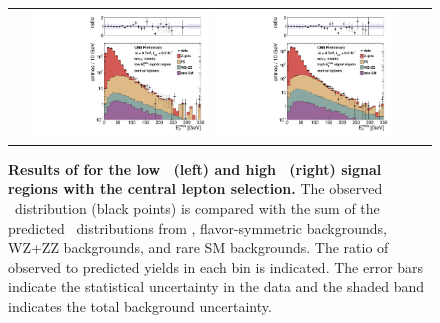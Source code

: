 \begin{figure}[!h]
\begin{center}
\begin{tabular}{cc}
\includegraphics[width=0.45\textwidth]{plots/edge_pfmet_pt40_lowMet_central_all.pdf}
\includegraphics[width=0.45\textwidth]{plots/edge_pfmet_pt40_highMet_central_all.pdf}
\end{tabular}
\caption{\footnotesize {\bf Results of for the low \MET\ (left) and high \MET\ (right) signal regions with the central lepton selection.}
The observed \MET\ distribution (black points) is compared with the sum of the predicted \MET\
distributions from \zjets, flavor-symmetric backgrounds, WZ+ZZ backgrounds, and rare SM backgrounds. 
The ratio of observed to predicted yields in each bin is
indicated. The error bars indicate the statistical uncertainty in the data and the shaded band indicates the total background uncertainty.
\label{fig:results_central}
}
\end{center}
\end{figure}

